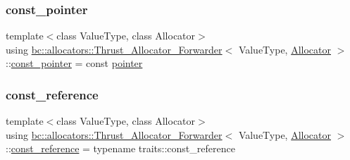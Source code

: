 \subsubsection{\texorpdfstring{const\+\_\+pointer}{const\_pointer}}
{\footnotesize\ttfamily template$<$class Value\+Type, class Allocator$>$ \\
using \hyperlink{structbc_1_1allocators_1_1Thrust__Allocator__Forwarder}{bc\+::allocators\+::\+Thrust\+\_\+\+Allocator\+\_\+\+Forwarder}$<$ Value\+Type, \hyperlink{classbc_1_1allocators_1_1Allocator}{Allocator} $>$\+::\hyperlink{structbc_1_1allocators_1_1Thrust__Allocator__Forwarder_ae97e5b4700a6be8359c5d1fc8f82940a}{const\+\_\+pointer} =  const \hyperlink{structbc_1_1allocators_1_1Thrust__Allocator__Forwarder_ad65c1d99f764c14eb0f65dc78d36e56a}{pointer}}

\mbox{\label{structbc_1_1allocators_1_1Thrust__Allocator__Forwarder_ad19d3bbcf59373c90bb8aceb3e8444ca}} 
\subsubsection{\texorpdfstring{const\+\_\+reference}{const\_reference}}
{\footnotesize\ttfamily template$<$class Value\+Type, class Allocator$>$ \\
using \hyperlink{structbc_1_1allocators_1_1Thrust__Allocator__Forwarder}{bc\+::allocators\+::\+Thrust\+\_\+\+Allocator\+\_\+\+Forwarder}$<$ Value\+Type, \hyperlink{classbc_1_1allocators_1_1Allocator}{Allocator} $>$\+::\hyperlink{structbc_1_1allocators_1_1Thrust__Allocator__Forwarder_ad19d3bbcf59373c90bb8aceb3e8444ca}{const\+\_\+reference} =  typename traits\+::const\+\_\+reference}

\mbox{\label{structbc_1_1allocators_1_1Thrust__Allocator__Forwarder_a9e16371c961dd61923bc88863d76846f}} 
